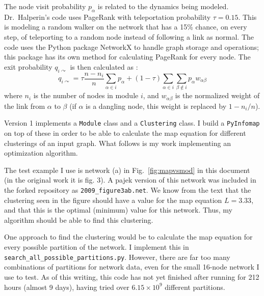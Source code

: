 The node visit probability \(p_{\alpha}\) is related to the dynamics
being modeled. Dr.~Halperin's code uses PageRank with teleportation
probability \(\tau = 0.15\). This is modeling a random walker on the
network that has a 15\% chance, on every step, of teleporting to a
random node instead of following a link as normal. The code uses the
Python package NetworkX \autocite{hagberg_exploring_2008} to handle
graph storage and operations; this package has its own method for
calculating PageRank for every node. The exit probability
\(q_{i\curvearrowright}\) is then calculated as
\autocite{rosvall_map_2010}:
\[q_{i\curvearrowright} = \tau \frac{n-n_i}{n} \sum_{\alpha \in i}{p_{\alpha}} + (1-\tau) \sum_{\alpha \in i}{\sum_{\beta \notin i}{p_{\alpha}w_{\alpha \beta}}}\]
where \(n_i\) is the number of nodes in module \(i\), and
\(w_{\alpha \beta}\) is the normalized weight of the link from
\(\alpha\) to \(\beta\) (if \(\alpha\) is a dangling node, this weight
is replaced by \(1-n_i/n\)).

Version 1 implements a \texttt{Module} class and a \texttt{Clustering}
class. I build a \texttt{PyInfomap} on top of these in order to be able
to calculate the map equation for different clusterings of an input
graph. What follows is my work implementing an optimization algorithm.

The test example I use is network (a) in Fig.~\ref{fig:mapvsmod} in this
document (in the original work \autocite{rosvall_map_2010} it is fig.
3). A pajek version of this network was included in the forked
repository as \texttt{2009\_figure3ab.net}. We know from the text
\autocite{rosvall_map_2010} that the clustering seen in the figure
should have a value for the map equation \(L = 3.33\), and that this is
the optimal (minimum) value for this network. Thus, my algorithm should
be able to find this clustering.

One approach to find the clustering would be to calculate the map
equation for every possible partition of the network. I implement this
in \texttt{search\_all\_possible\_partitions.py}. However, there are far
too many combinations of partitions for network data, even for the small
16-node network I use to test. As of this writing, this code has not yet
finished after running for 212 hours (almost 9 days), having tried over
\(6.15 \times 10^9\) different partitions.

